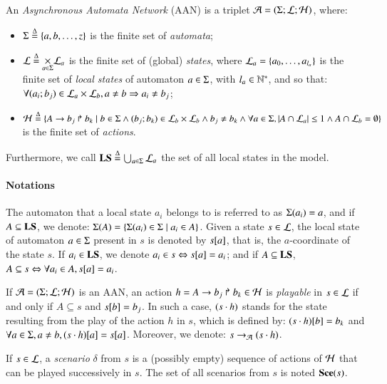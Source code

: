 \begin{definition}
\label{def:ph}
  An \emph{Asynchronous Automata Network} (AAN) is a triplet $\mathcal{A} = (\Sigma; \mathcal{L}; \mathcal{H})$,
  where:
  \begin{itemize}
    \item $\Sigma \stackrel{\Delta}= \{a, b, \dots, z\}$ is the finite set of \emph{automata};
    \item $\mathcal{L} \stackrel{\Delta}= \underset{a \in \Sigma}{\times} \mathcal{L}_a$ is the finite set of
      (global) \emph{states},
      where $\mathcal{L}_a = \{a_0, \ldots, a_{l_a}\}$ is the finite set of \emph{local states}
      of automaton $a \in \Sigma$, with $l_a \in \mathbb{N}^*$,
      and so that:
      $\forall (a_i; b_j) \in \mathcal{L}_a \times \mathcal{L}_b, a \neq b \Rightarrow a_i \neq b_j$;
    \item $\mathcal{H} \stackrel{\Delta}= \{A\rightarrow b_j\Rsh b_k \mid
      b \in \Sigma \wedge (b_j; b_k) \in \mathcal{L}_b \times \mathcal{L}_b \wedge
      b_j \neq b_k \wedge
      \forall a \in \Sigma, |A \cap \mathcal{L}_a| \leq 1 \wedge
      A \cap \mathcal{L}_b = \emptyset \}$ is the finite set of \emph{actions}.
  \end{itemize}
  Furthermore,
  we call $\mathbf{LS} \stackrel{\Delta}= \bigcup_{a \in \Sigma} \mathcal{L}_a$ the set of all local states in the model.
\end{definition}

\paragraph{Notations}
The automaton that a local state $a_i$ belongs to is referred to as $\Sigma(a_i) = a$,
and if $A \subseteq \mathbf{LS}$, we denote:
$\Sigma(A) = \{ \Sigma(a_i) \in \Sigma \mid a_i \in A \}$.
Given a state $s\in \mathcal{L}$, the local state of automaton $a \in \Sigma$ present in $s$ is denoted by ${s[a]}$, that is, the $a$-coordinate of the state $s$.
If $a_i \in \mathbf{LS}$, we denote $a_i \in s \Leftrightarrow {s[a]} = a_i$;
and if $A\subseteq\mathbf{LS}$, $A\subseteq s \Leftrightarrow \forall a_i\in A, {s[a]} = a_i$.

\begin{definition}
\label{def:play}
  If $\mathcal{A} = (\Sigma; \mathcal{L}; \mathcal{H})$ is an AAN,
  an action $h = A\rightarrow b_j\Rsh b_k \in \mathcal{H}$ is \emph{playable} in $s \in \mathcal{L}$
  if and only if $A \subseteq s$ and ${s[b]} = b_j$.
  In such a case, $(s \cdot h)$ stands for the state resulting from the play of the action $h$ in $s$, which is defined by:
    ${(s \cdot h)[b]} = b_k$
  and
    $\forall a \in \Sigma, a \neq b, {(s\cdot h)[a]} = {s[a]}$.
  Moreover, we denote: $s \rightarrow_{\mathcal{A}} (s \cdot h)$.

  If $s \in \mathcal{L}$,
  a \emph{scenario} $\delta$ from $s$ is a (possibly empty) sequence of actions of $\mathcal{H}$
  that can be played successively in $s$.
  The set of all scenarios from $s$ is noted $\mathbf{Sce}(s)$.
\end{definition}



